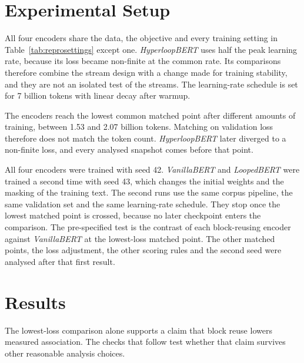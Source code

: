 \documentclass[sigconf,natbib=true]{acmart}
\begin{document}
\section{Experimental Setup}
\label{sec:setup}

All four encoders share the data, the objective and every training setting in
Table~\ref{tab:reprosettings} except one. \emph{HyperloopBERT} uses half the peak
learning rate, because its loss became non-finite at the common rate. Its
comparisons therefore combine the stream design with a change made for training
stability, and they are not an isolated test of the streams. The learning-rate
schedule is set for 7 billion tokens with linear decay after warmup.

The encoders reach the lowest common matched point after different amounts of
training, between 1.53 and 2.07 billion tokens. Matching on validation loss
therefore does not match the token count. \emph{HyperloopBERT} later diverged
to a non-finite loss, and every analysed snapshot comes before that point.

All four encoders were trained with seed 42. \emph{VanillaBERT} and
\emph{LoopedBERT} were trained a second time with seed 43, which changes the
initial weights and the masking of the training text. The second runs use the
same corpus pipeline, the same validation set and the same learning-rate
schedule. They stop once the lowest matched point is crossed, because no later
checkpoint enters the comparison. The pre-specified test is the contrast of each
block-reusing encoder against \emph{VanillaBERT} at the lowest-loss matched
point. The other matched points, the loss adjustment, the other scoring rules and
the second seed were analysed after that first result.

\section{Results}
\label{sec:results}

The lowest-loss comparison alone supports a claim that block reuse lowers
measured association. The checks that follow test whether that claim survives
other reasonable analysis choices.
\end{document}

